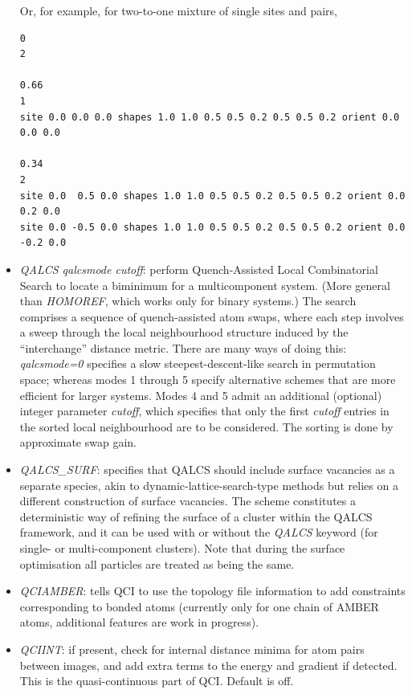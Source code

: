\documentclass[12pt,a4paper,dvips]{article}
\begin{document}
\begin{itemize}
Or, for example, for two-to-one mixture of single sites and pairs,
\begin{verbatim}
0
2

0.66
1
site 0.0 0.0 0.0 shapes 1.0 1.0 0.5 0.5 0.2 0.5 0.5 0.2 orient 0.0 0.0 0.0

0.34
2
site 0.0  0.5 0.0 shapes 1.0 1.0 0.5 0.5 0.2 0.5 0.5 0.2 orient 0.0  0.2 0.0
site 0.0 -0.5 0.0 shapes 1.0 1.0 0.5 0.5 0.2 0.5 0.5 0.2 orient 0.0 -0.2 0.0
\end{verbatim}


\item {\it QALCS qalcsmode cutoff\/}: perform Quench-Assisted Local Combinatorial Search to locate a biminimum for a multicomponent system. (More general than {\it HOMOREF\/}, which works only for binary systems.) The search comprises a sequence of quench-assisted atom swaps, where each step involves a sweep through the local neighbourhood structure induced by the ``interchange'' distance metric. There are many ways of doing this: {\it qalcsmode=0\/} specifies a slow steepest-descent-like search in permutation space; whereas modes 1 through 5 specify alternative schemes that are more efficient for larger systems. Modes 4 and 5 admit an additional (optional) integer parameter {\it cutoff}, which specifies that only the first {\it cutoff} entries in the sorted local neighbourhood are to be considered. The sorting is done by approximate swap gain. 

\item {\it QALCS\_SURF\/}: specifies that QALCS should include surface vacancies as a separate species, akin to dynamic-lattice-search-type methods but relies on a different construction of surface vacancies. The scheme constitutes a deterministic way of refining the surface of a cluster within the QALCS framework, and it can be used with or without the
{\it QALCS\/} keyword (for single- or multi-component clusters). Note that during the surface optimisation all particles are treated as being the same.

\item {\it QCIAMBER}: tells QCI to use the topology file information to add constraints 
corresponding to bonded atoms 
(currently only for one chain of AMBER atoms, additional features are work in progress).

\item {\it QCIINT}: if present, check for internal distance minima for atom pairs between
images, and add extra terms to the energy and gradient if detected. This is the quasi-continuous
part of QCI. Default is off.


\end{itemize}
\end{document}
